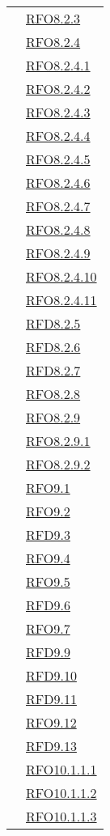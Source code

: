 \begin{longtable}{|>{\centering}m{5cm}|m{5cm}<{\centering}|}
& \hyperlink{RFO8.2.3}{RFO8.2.3}\\
& \hyperlink{RFO8.2.4}{RFO8.2.4}\\
& \hyperlink{RFO8.2.4.1}{RFO8.2.4.1}\\
& \hyperlink{RFO8.2.4.2}{RFO8.2.4.2}\\
& \hyperlink{RFO8.2.4.3}{RFO8.2.4.3}\\
& \hyperlink{RFO8.2.4.4}{RFO8.2.4.4}\\
& \hyperlink{RFO8.2.4.5}{RFO8.2.4.5}\\
& \hyperlink{RFO8.2.4.6}{RFO8.2.4.6}\\
& \hyperlink{RFO8.2.4.7}{RFO8.2.4.7}\\
& \hyperlink{RFO8.2.4.8}{RFO8.2.4.8}\\
& \hyperlink{RFO8.2.4.9}{RFO8.2.4.9}\\
& \hyperlink{RFO8.2.4.10}{RFO8.2.4.10}\\
& \hyperlink{RFO8.2.4.11}{RFO8.2.4.11}\\
& \hyperlink{RFD8.2.5}{RFD8.2.5}\\
& \hyperlink{RFD8.2.6}{RFD8.2.6}\\
& \hyperlink{RFD8.2.7}{RFD8.2.7}\\
& \hyperlink{RFO8.2.8}{RFO8.2.8}\\
& \hyperlink{RFO8.2.9}{RFO8.2.9}\\
& \hyperlink{RFO8.2.9.1}{RFO8.2.9.1}\\
& \hyperlink{RFO8.2.9.2}{RFO8.2.9.2}\\
& \hyperlink{RFO9.1}{RFO9.1}\\
& \hyperlink{RFO9.2}{RFO9.2}\\
& \hyperlink{RFD9.3}{RFD9.3}\\
& \hyperlink{RFO9.4}{RFO9.4}\\
& \hyperlink{RFO9.5}{RFO9.5}\\
& \hyperlink{RFD9.6}{RFD9.6}\\
& \hyperlink{RFO9.7}{RFO9.7}\\
& \hyperlink{RFD9.9}{RFD9.9}\\
& \hyperlink{RFD9.10}{RFD9.10}\\
& \hyperlink{RFD9.11}{RFD9.11}\\
& \hyperlink{RFO9.12}{RFO9.12}\\
& \hyperlink{RFD9.13}{RFD9.13}\\
& \hyperlink{RFO10.1.1.1}{RFO10.1.1.1}\\
& \hyperlink{RFO10.1.1.2}{RFO10.1.1.2}\\
& \hyperlink{RFO10.1.1.3}{RFO10.1.1.3}\\

\end{longtable}
